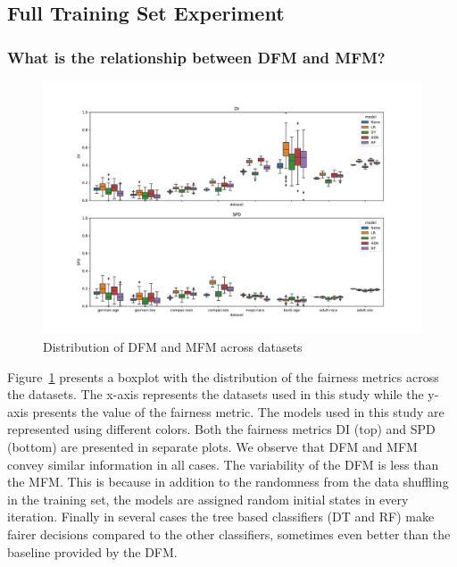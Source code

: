 \documentclass{article}
\begin{document}

\subsection{Full Training Set Experiment}\label{sec:results-full}
\subsubsection{What is the relationship between DFM and MFM?}\label{sec:results-full-rel}

\begin{figure}
  \centering
  \includegraphics[width=0.95\linewidth]{boxplot--dataset--di-spd--exp-full.pdf}
  \caption{Distribution of DFM and MFM across datasets}
  \label{fig:boxplot--dataset--di-spd--exp-full}
\end{figure}

Figure \ref{fig:boxplot--dataset--di-spd--exp-full} presents a boxplot
with the distribution of the fairness metrics across the datasets. The
x-axis represents the datasets used in this study while the y-axis
presents the value of the fairness metric. The models used in this
study are represented using different colors. Both the fairness
metrics DI (top) and SPD (bottom) are presented in separate plots. We
observe that DFM and MFM convey similar information in all cases. The
variability of the DFM is less than the MFM. This is because
in addition to the randomness from the data shuffling in the training
set, the models are assigned random initial states in every iteration.
Finally in several cases the tree based classifiers (DT and RF) make
fairer decisions compared to the other classifiers, sometimes even
better than the baseline provided by the DFM.
\end{document}
